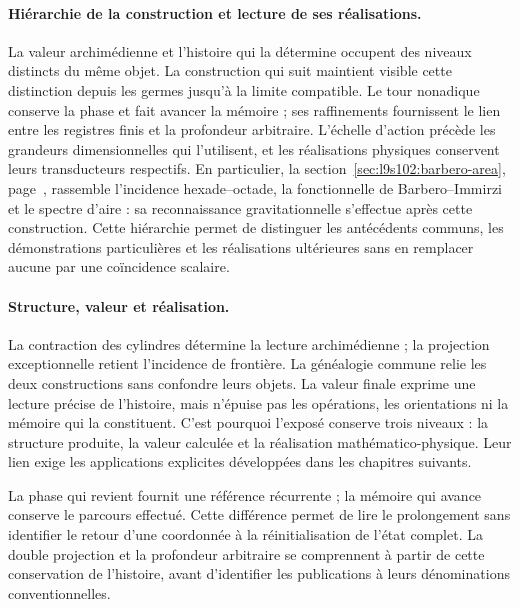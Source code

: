 \paragraph{Hiérarchie de la construction et lecture de ses réalisations.}
La valeur archimédienne et l'histoire qui la détermine occupent des niveaux
distincts du même objet. La construction qui suit maintient visible cette
distinction depuis les germes jusqu'à la limite compatible. Le tour
nonadique conserve la phase et fait avancer la mémoire ; ses raffinements fournissent
le lien entre les registres finis et la profondeur arbitraire.
L'échelle d'action précède les grandeurs dimensionnelles qui l'utilisent,
et les réalisations physiques conservent leurs transducteurs respectifs.
En particulier, la section~\ref{sec:l9s102:barbero-area},
page~\pageref{sec:l9s102:barbero-area}, rassemble l'incidence
hexade--octade, la fonctionnelle de Barbero--Immirzi et le spectre d'aire :
sa reconnaissance gravitationnelle s'effectue après cette construction.
Cette hiérarchie permet de distinguer les antécédents communs, les
démonstrations particulières et les réalisations ultérieures sans en remplacer
aucune par une coïncidence scalaire.

\paragraph{Structure, valeur et réalisation.}
La contraction des cylindres détermine la lecture archimédienne ; la
projection exceptionnelle retient l'incidence de frontière. La généalogie
commune relie les deux constructions sans confondre leurs objets. La valeur finale
exprime une lecture précise de l'histoire, mais n'épuise pas les opérations,
les orientations ni la mémoire qui la constituent. C'est pourquoi l'exposé
conserve trois niveaux : la structure produite, la valeur calculée et la
réalisation mathématico-physique. Leur lien exige les applications explicites
développées dans les chapitres suivants.

La phase qui revient fournit une référence récurrente ; la mémoire qui
avance conserve le parcours effectué. Cette différence permet de lire le
prolongement sans identifier le retour d'une coordonnée à la réinitialisation
de l'état complet. La double projection et la profondeur arbitraire se
comprennent à partir de cette conservation de l'histoire, avant d'identifier les
publications à leurs dénominations conventionnelles.

